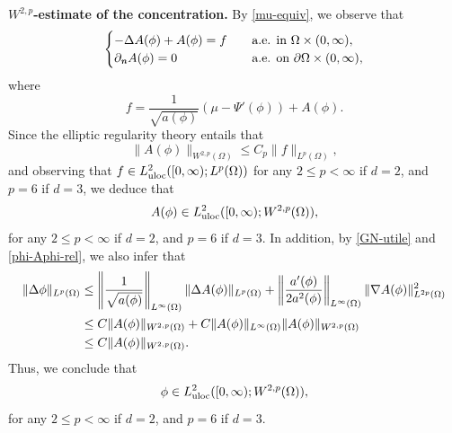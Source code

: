 \documentclass[11pt,reqno]{amsart}
\theoremstyle{remark}
\def\n{\textbf{\textit{n}}}
\numberwithin{equation}{section}
\begin{document}
\medskip

\textbf{$W^{2,p}$-estimate of the concentration.} By \eqref{mu-equiv}, we observe that
\begin{equation}
\label{Aphi-ELL}
\begin{cases}
-\Delta A(\phi)+ A(\phi) = f \quad &\text{a.e. in }\Omega 
\times (0,\infty), \\
\partial_{\n} A(\phi)=0\quad &\text{a.e. on }\partial \Omega \times (0,\infty),
\end{cases}
\end{equation}
where
$$
f=\frac{1}{\sqrt{a(\phi)}} \left( \mu- \Psi'(\phi) \right) + A(\phi).
$$
Since the elliptic regularity theory entails that
\begin{equation}
\label{A2p}
\| A(\phi)\|_{W^{2,p}(\Omega)}\leq C_p \| f\|_{L^p(\Omega)},
\end{equation}
and observing that $f \in L_{\rm uloc}^2([0,\infty); L^p(\Omega))$ 
for any $2 \leq p < \infty$ if $d=2$, and $p=6$ if $d=3$,
we deduce that 
$$
A(\phi) \in L_{\rm uloc}^2([0,\infty); W^{2,p}(\Omega)), 
$$
for any $2 \leq p < \infty$ if $d=2$, and $p=6$ if $d=3$.
In addition, by \eqref{GN-utile} and  \eqref{phi-Aphi-rel}, we also infer that
\begin{align}
\| \Delta \phi\|_{L^p(\Omega)}
&
\leq
\left\| \frac{1}{\sqrt{a(\phi)}} \right\|_{L^\infty(\Omega)}
\| \Delta A(\phi) \|_{L^p(\Omega)}
+ \left\| \frac{a'(\phi)}{2 a^2(\phi)} \right\|_{L^\infty(\Omega)}
\| \nabla A(\phi)\|_{L^{2p}(\Omega)}^2
\notag
\\
&\leq
C \| A(\phi)\|_{W^{2,p}(\Omega)} + C \|A(\phi)\|_{L^\infty(\Omega)}  \|A(\phi)\|_{W^{2,p}(\Omega)}
\notag
\\
&\leq C \| A(\phi)\|_{W^{2,p}(\Omega)}.
\label{phi-W2p}
\end{align}
Thus, we conclude that
\begin{equation*}
\phi \in L_{\rm uloc}^2([0,\infty); W^{2,p}(\Omega)), 
\end{equation*}
for any $2 \leq p < \infty$ if $d=2$, and $p=6$ if $d=3$.
\end{document}
